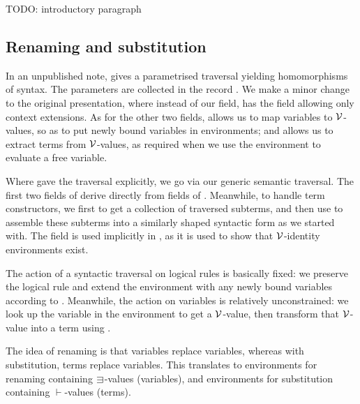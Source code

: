 TODO: introductory paragraph

\subsection{Renaming and substitution}\label{sec:kits}

In an unpublished note, \citet{McBride05} gives a parametrised traversal
yielding homomorphisms of syntax.
The parameters are collected in the record .
We make a minor change to the original presentation, where instead of our
 field, \citeauthor{McBride05} has the
field  allowing only context extensions.
As for the other two fields,  allows us to map variables to
$\mathcal V$-values, so as to put newly bound variables in environments; and
 allows us to extract terms from $\mathcal V$-values, as required when
we use the environment to evaluate a free variable.


Where \citeauthor{McBride05} gave the traversal explicitly, we go via our
generic semantic traversal.
The first two fields of  derive directly from fields of
.
Meanwhile, to handle term constructors, we first  to get a
collection of traversed subterms, and then use 
to assemble these subterms into a similarly shaped syntactic form as we started
with.
The  field is used implicitly in , as it is
used to show that $\mathcal V$-identity environments exist.


The action of a syntactic traversal on logical rules is basically fixed: we
preserve the logical rule and extend the environment with any newly bound
variables according to .
Meanwhile, the action on variables is relatively unconstrained: we look up the
variable in the environment to get a $\mathcal V$-value, then transform that $\mathcal V$-value
into a term using .

The idea of renaming is that variables replace variables, whereas with
substitution, terms replace variables.
This translates to environments for renaming containing $\sqni$-values
(variables), and environments for substitution containing $\vdash$-values
(terms).


